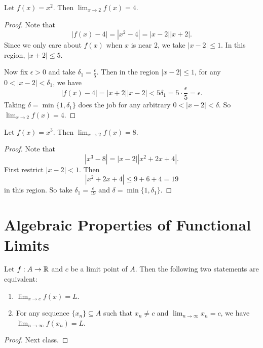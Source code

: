 \begin{exercise}
  Let $f(x) = x^2$. Then $\lim_{x \to 2} f(x) = 4$.
\end{exercise}

\begin{proof}
  Note that
  \[|f(x) - 4| = |x^2 - 4| = |x - 2| |x + 2|.\]
  Since we only care about $f(x)$ when $x$ is near 2,
  we take $|x - 2| \le 1$. In this region,
  $|x + 2| \le 5$.

  Now fix $\epsilon > 0$ and take
  $\delta_1 = \frac{\epsilon}{5}$. Then in the region
  $|x - 2| \le 1$, for any $0 < |x - 2| < \delta_1$, we have
  \[|f(x) - 4| = |x + 2||x - 2| < 5 \delta_1 = 5 \cdot \frac{\epsilon}{5} = \epsilon.\]
  Taking $\delta = \min\{1, \delta_1\}$ does the job
  for any arbitrary $0 < |x - 2| < \delta$. So
  $\lim_{x \to 2} f(x) = 4$.
\end{proof}

\begin{exercise}
  Let $f(x) = x^3$. Then $\lim_{x \to 2} f(x) = 8$.
\end{exercise}

\begin{proof}
  Note that
  \[|x^3 - 8| = |x - 2| |x^2 + 2x + 4|.\]
  First restrict $|x - 2| < 1$. Then
  \[|x^2 + 2x + 4| \le 9 + 6 + 4 = 19\]
  in this region. So take
  $\delta_1 = \frac{\epsilon}{19}$ and
  $\delta = \min\{1, \delta_1\}$.
\end{proof}

\section{Algebraic Properties of Functional Limits}
\begin{theorem}
  Let $f : A \to \mathbb{R}$ and $c$ be a limit point of $A$.
  Then the following two statements are equivalent:
  \begin{enumerate}
    \item $\lim_{x \to c} f(x) = L$.
    \item For any sequence $\{x_n\} \subseteq A$ such that
      $x_n \ne c$ and
      $\lim_{n \to \infty} x_n = c$, we have
      $\lim_{n \to \infty} f(x_n) = L$.
  \end{enumerate}
\end{theorem}

\begin{proof}
  Next class.
\end{proof}
